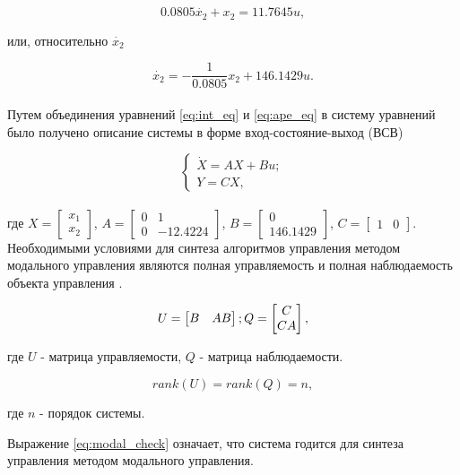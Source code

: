 $$
  0.0805\dot{x_2} + x_2 = 11.7645u,
$$

или, относительно $\dot{x_2}$

\begin{equation}
  \dot{x_2}=-\frac{1}{0.0805}x_2+146.1429u.
  \label{eq:ape_eq}
\end{equation}\\

Путем объединения уравнений \ref{eq:int_eq} и \ref{eq:ape_eq} в систему уравнений было получено
описание системы в форме вход-состояние-выход (ВСВ)

$$
  \begin{cases}
    \dot{X}=AX+Bu;
    \\
    Y=CX,
  \end{cases}
$$\\

где $X=\begin{bmatrix}x_1\\x_2\end{bmatrix}$, $A=\begin{bmatrix}0&1\\0& -12.4224\end{bmatrix}$, 
$B=\begin{bmatrix}0\\146.1429\end{bmatrix}$, $C=\begin{bmatrix}1&0\end{bmatrix}$.\\

Необходимыми условиями для синтеза алгоритмов управления методом модального управления
являются полная управляемость и полная наблюдаемость объекта управления \cite{МодальноеУправление}.

$$
  U = \begin{bmatrix}B&AB\end{bmatrix};
  \\
  Q = \begin{bmatrix}C\\CA\end{bmatrix},
$$

где $U$ - матрица управляемости, $Q$ - матрица наблюдаемости.

\begin{equation}
  rank(U) = rank(Q) = n,
  \label{eq:modal_check}
\end{equation}

где $n$ - порядок системы.

Выражение \ref{eq:modal_check} означает, что система годится для синтеза управления методом
модального управления.

